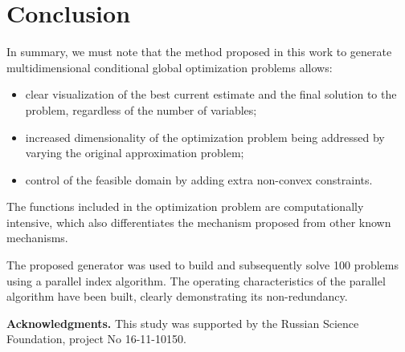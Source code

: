 \documentclass{llncs}
\begin{document}
\section {Conclusion}

In summary, we must note that the method proposed in this work to generate multidimensional conditional global optimization problems allows:

\begin{itemize}
	\item clear visualization of the best current estimate and the final solution to the problem, regardless of the number of variables;
	\item increased dimensionality of the optimization problem being addressed by varying the original approximation problem;
	\item control of the feasible domain by adding extra non-convex constraints.
\end{itemize}
The functions included in the optimization problem are computationally intensive, which also differentiates the mechanism proposed from other known mechanisms.

The proposed generator was used to build and subsequently solve 100 problems using a parallel index algorithm. The operating characteristics of the parallel algorithm have been built, clearly demonstrating its non-redundancy.

\bigskip \textbf{Acknowledgments.} This study was supported by the Russian Science Foundation, project No 16-11-10150.
\end{document}
